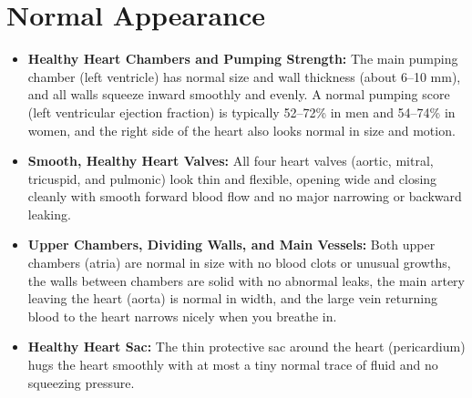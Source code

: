 \section{Normal Appearance}
\begin{itemize}
\item \textbf{Healthy Heart Chambers and Pumping Strength:} The main pumping chamber (left ventricle) has normal size and wall thickness (about 6--10 mm), and all walls squeeze inward smoothly and evenly. A normal pumping score (left ventricular ejection fraction) is typically 52--72\% in men and 54--74\% in women, and the right side of the heart also looks normal in size and motion.
\item \textbf{Smooth, Healthy Heart Valves:} All four heart valves (aortic, mitral, tricuspid, and pulmonic) look thin and flexible, opening wide and closing cleanly with smooth forward blood flow and no major narrowing or backward leaking.
\item \textbf{Upper Chambers, Dividing Walls, and Main Vessels:} Both upper chambers (atria) are normal in size with no blood clots or unusual growths, the walls between chambers are solid with no abnormal leaks, the main artery leaving the heart (aorta) is normal in width, and the large vein returning blood to the heart narrows nicely when you breathe in.
\item \textbf{Healthy Heart Sac:} The thin protective sac around the heart (pericardium) hugs the heart smoothly with at most a tiny normal trace of fluid and no squeezing pressure.
\end{itemize}


